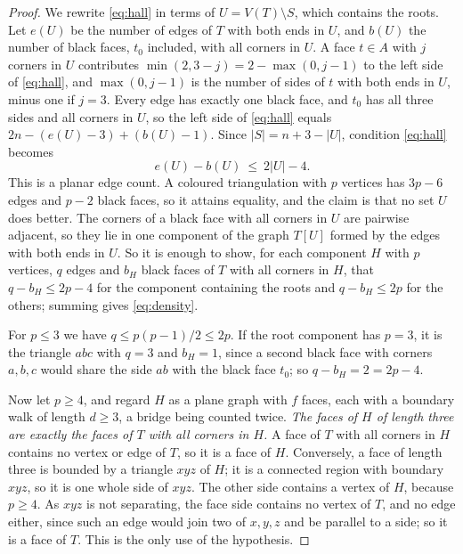 \documentclass[10pt]{amsart}
\numberwithin{equation}{section}
\theoremstyle{definition}
\theoremstyle{remark}
\newcommand{\T}{T}
\begin{document}
\begin{proof}
We rewrite \eqref{eq:hall} in terms of $U=V(\T)\setminus S$, which contains the roots.
Let $e(U)$ be the number of edges of $\T$ with both ends in $U$, and $b(U)$ the number of black faces, $t_0$ included, with all corners in $U$.
A face $t\in A$ with $j$ corners in $U$ contributes $\min(2,3-j)=2-\max(0,j-1)$ to the left side of \eqref{eq:hall}, and $\max(0,j-1)$ is the number of sides of $t$ with both ends in $U$, minus one if $j=3$.
Every edge has exactly one black face, and $t_0$ has all three sides and all corners in $U$, so the left side of \eqref{eq:hall} equals $2n-(e(U)-3)+(b(U)-1)$.
Since $|S|=n+3-|U|$, condition \eqref{eq:hall} becomes
\begin{equation}\label{eq:density}
e(U)-b(U)\ \le\ 2|U|-4 .
\end{equation}
This is a planar edge count.
A coloured triangulation with $p$ vertices has $3p-6$ edges and $p-2$ black faces, so it attains equality, and the claim is that no set $U$ does better.
The corners of a black face with all corners in $U$ are pairwise adjacent, so they lie in one component of the graph $\T[U]$ formed by the edges with both ends in $U$.
So it is enough to show, for each component $H$ with $p$ vertices, $q$ edges and $b_H$ black faces of $\T$ with all corners in $H$, that $q-b_H\le 2p-4$ for the component containing the roots and $q-b_H\le 2p$ for the others; summing gives \eqref{eq:density}.

For $p\le3$ we have $q\le p(p-1)/2\le 2p$.
If the root component has $p=3$, it is the triangle $abc$ with $q=3$ and $b_H=1$, since a second black face with corners $a,b,c$ would share the side $ab$ with the black face $t_0$; so $q-b_H=2=2p-4$.

Now let $p\ge4$, and regard $H$ as a plane graph with $f$ faces, each with a boundary walk of length $d\ge3$, a bridge being counted twice.
\emph{The faces of $H$ of length three are exactly the faces of $\T$ with all corners in $H$.}
A face of $\T$ with all corners in $H$ contains no vertex or edge of $\T$, so it is a face of $H$.
Conversely, a face of length three is bounded by a triangle $xyz$ of $H$; it is a connected region with boundary $xyz$, so it is one whole side of $xyz$.
The other side contains a vertex of $H$, because $p\ge4$.
As $xyz$ is not separating, the face side contains no vertex of $\T$, and no edge either, since such an edge would join two of $x,y,z$ and be parallel to a side; so it is a face of $\T$.
This is the only use of the hypothesis.


\end{proof}
\end{document}
